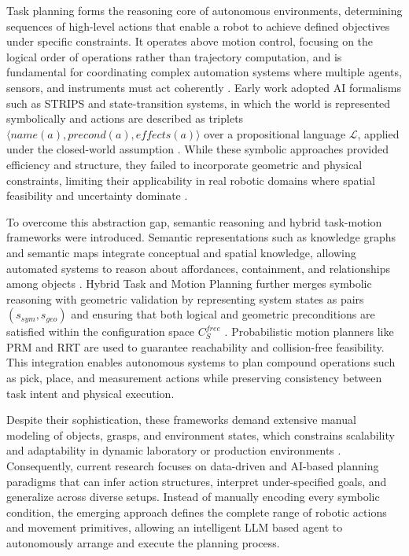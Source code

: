 
Task planning forms the reasoning core of autonomous environments, determining sequences of high-level actions that enable a robot to achieve defined objectives under specific constraints. It operates above motion control, focusing on the logical order of operations rather than trajectory computation, and is fundamental for coordinating complex automation systems where multiple agents, sensors, and instruments must act coherently \cite{SicilianoKhatib2008}. Early work adopted AI formalisms such as STRIPS and state-transition systems, in which the world is represented symbolically and actions are described as triplets $\langle name(a), precond(a), effects(a) \rangle$ over a propositional language $\mathcal{L}$, applied under the closed-world assumption \cite{cambon2009hybrid}. While these symbolic approaches provided efficiency and structure, they failed to incorporate geometric and physical constraints, limiting their applicability in real robotic domains where spatial feasibility and uncertainty dominate \cite{cambon2009hybrid}.

To overcome this abstraction gap, semantic reasoning and hybrid task-motion frameworks were introduced. Semantic representations such as knowledge graphs and semantic maps integrate conceptual and spatial knowledge, allowing automated systems to reason about affordances, containment, and relationships among objects \cite{semanticmaps}. Hybrid Task and Motion Planning further merges symbolic reasoning with geometric validation by representing system states as pairs $(s_{sym}, s_{geo})$ and ensuring that both logical and geometric preconditions are satisfied within the configuration space $C_S^{free}$ \cite{cambon2009hybrid}. Probabilistic motion planners like PRM and RRT are used to guarantee reachability and collision-free feasibility. This integration enables autonomous systems to plan compound operations such as pick, place, and measurement actions while preserving consistency between task intent and physical execution.

Despite their sophistication, these frameworks demand extensive manual modeling of objects, grasps, and environment states, which constrains scalability and adaptability in dynamic laboratory or production environments \cite{cambon2009hybrid, semanticmaps}. Consequently, current research focuses on data-driven and AI-based planning paradigms that can infer action structures, interpret under-specified goals, and generalize across diverse setups. Instead of manually encoding every symbolic condition, the emerging approach defines the complete range of robotic actions and movement primitives, allowing an intelligent LLM based agent to autonomously arrange and execute the planning process.